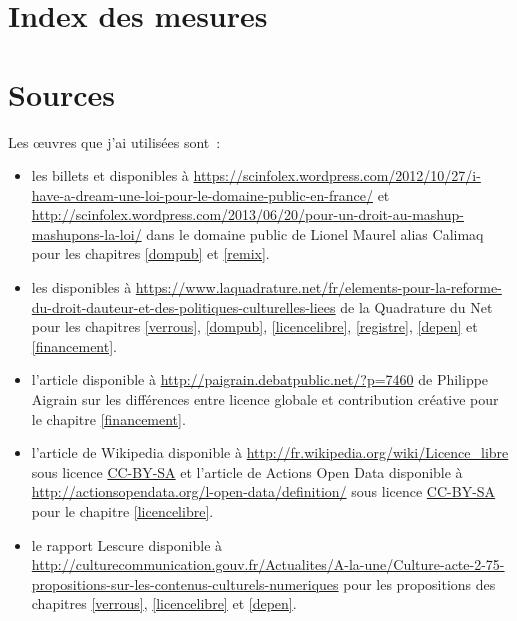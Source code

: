 \chapter{Index des mesures}\label{index}


\chapter{Sources}


Les œuvres que j'ai utilisées sont~:

\begin{itemize}
\item les billets  et  disponibles à \url{https://scinfolex.wordpress.com/2012/10/27/i-have-a-dream-une-loi-pour-le-domaine-public-en-france/} et \url{http://scinfolex.wordpress.com/2013/06/20/pour-un-droit-au-mashup-mashupons-la-loi/} dans le domaine public de Lionel Maurel alias Calimaq pour les chapitres \ref{dompub} et \ref{remix}.
\item les  disponibles à \url{https://www.laquadrature.net/fr/elements-pour-la-reforme-du-droit-dauteur-et-des-politiques-culturelles-liees} de la Quadrature du Net pour les chapitres \ref{verrous}, \ref{dompub}, \ref{licencelibre}, \ref{registre}, \ref{depen} et \ref{financement}.
\item l'article  disponible à \url{http://paigrain.debatpublic.net/?p=7460} de Philippe Aigrain sur les différences entre licence globale et contribution créative pour le chapitre \ref{financement}.
\item l'article  de Wikipedia disponible à \url{http://fr.wikipedia.org/wiki/Licence_libre} sous licence \href{http://creativecommons.org/licenses/by-sa/2.0/fr/}{CC-BY-SA} et l'article  de Actions Open Data disponible à \url{http://actionsopendata.org/l-open-data/definition/} sous licence \href{http://creativecommons.org/licenses/by-sa/2.0/fr/}{CC-BY-SA} pour le chapitre \ref{licencelibre}.
\item le rapport Lescure disponible à \url{http://culturecommunication.gouv.fr/Actualites/A-la-une/Culture-acte-2-75-propositions-sur-les-contenus-culturels-numeriques} pour les propositions des chapitres \ref{verrous}, \ref{licencelibre} et \ref{depen}.

\end{itemize}
